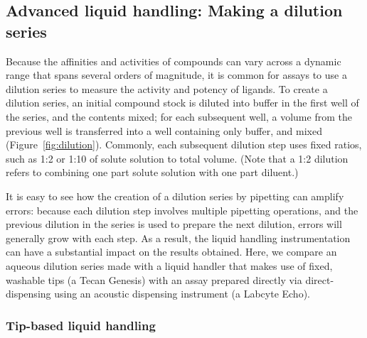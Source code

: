 \documentclass[aps,pre,twocolumn,nofootinbib,superscriptaddress,linenumbers]{revtex4-1}
\begin{document}
\subsection*{Advanced liquid handling: Making a dilution series}

Because the affinities and activities of compounds can vary across a dynamic range that spans several orders of magnitude, it is common for assays to use a dilution series to measure the activity and potency of ligands. 
To create a dilution series, an initial compound stock is diluted into buffer in the first well of the series, and the contents mixed; for each subsequent well, a volume from the previous well is transferred into a well containing only buffer, and mixed (Figure~\ref{fig:dilution}).
Commonly, each subsequent dilution step uses fixed ratios, such as 1:2 or 1:10 of solute solution to total volume.
(Note that a 1:2 dilution refers to combining one part solute solution with one part diluent.)

It is easy to see how the creation of a dilution series by pipetting can amplify errors:
because each dilution step involves multiple pipetting operations, and the previous dilution in the series is used to prepare the next dilution, errors will generally grow with each step.
As a result, the liquid handling instrumentation can have a substantial impact on the results obtained.
Here, we compare an aqueous dilution series made with a liquid handler that makes use of fixed, washable tips (a Tecan Genesis) with an assay prepared directly via direct-dispensing using an acoustic dispensing instrument (a Labcyte Echo).

\subsubsection*{Tip-based liquid handling}
\end{document}
